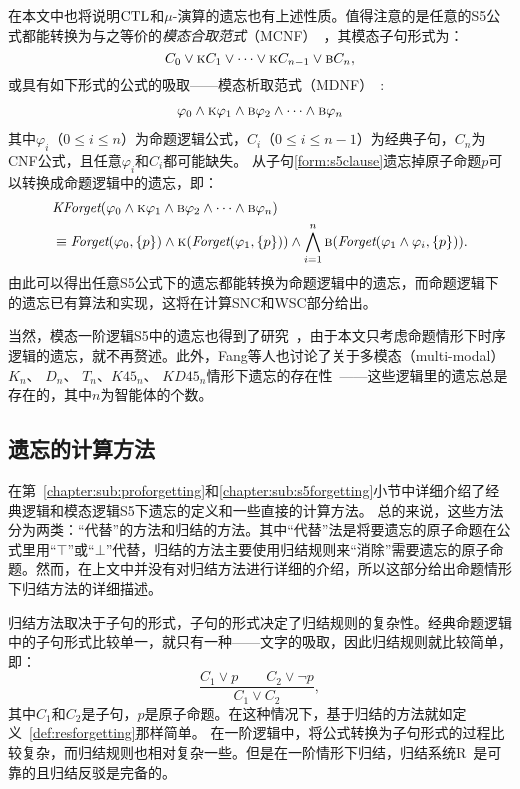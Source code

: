 在本文中也将说明$\textrm{CTL}$和$\mu$-演算的遗忘也有上述性质。值得注意的是任意的S5公式都能转换为与之等价的\emph{模态合取范式}（MCNF）~\cite{DBLP:conf/aaai/Bienvenu07}，其模态子句形式为：
$$C_0 \vee \textsc{k} C_1 \vee \dots \vee \textsc{k} C_{n-1} \vee \textsc{b} C_n,$$
或具有如下形式的公式的吸取——模态析取范式（MDNF）~\cite{Yongmei:IJCAI:2011,Zhang2008Properties}:
\begin{align}\label{form:s5clause}
	\varphi_0 \wedge \textsc{k} \varphi_1 \wedge \textsc{b} \varphi_2 \wedge \dots \wedge \textsc{b} \varphi_n
\end{align}
其中$\varphi_i$（$0\leq i \leq n$）为命题逻辑公式，$C_i$（$0\leq i \leq n-1$）为经典子句，$C_n$为CNF公式，且任意$\varphi_i$和$C_i$都可能缺失。
从子句\ref{form:s5clause}遗忘掉原子命题$p$可以转换成命题逻辑中的遗忘，即：
\begin{align*}
	&\textit{KForget}(\varphi_0 \wedge \textsc{k} \varphi_1 \wedge \textsc{b} \varphi_2 \wedge \dots \wedge \textsc{b} \varphi_n)\\
	&\equiv \textit{Forget}(\varphi_0, \{p\}) \wedge \textsc{k}(\textit{Forget}(\varphi_1, \{p\})) \wedge \bigwedge_{i=1}^{n}\textsc{b}(\textit{Forget}(\varphi_1 \wedge \varphi_i, \{p\})).
\end{align*}
由此可以得出任意S5公式下的遗忘都能转换为命题逻辑中的遗忘，而命题逻辑下的遗忘已有算法和实现，这将在计算SNC和WSC部分给出。



当然，模态一阶逻辑S5中的遗忘也得到了研究~\cite{Yongmei:IJCAI:2011}，由于本文只考虑命题情形下时序逻辑的遗忘，就不再赘述。此外，Fang等人也讨论了关于多模态（multi-modal）$K_n$、 $D_n$、 $T_n$、$K45_n$、 $KD45_n$情形下遗忘的存在性~\cite{DBLP:journals/ai/FangLD19}——这些逻辑里的遗忘总是存在的，其中$n$为智能体的个数。

\subsection{遗忘的计算方法}
在第~\ref{chapter:sub:proforgetting}和\ref{chapter:sub:s5forgetting}小节中详细介绍了经典逻辑和模态逻辑S5下遗忘的定义和一些直接的计算方法。
总的来说，这些方法分为两类：“代替”的方法和归结的方法。其中“代替”法是将要遗忘的原子命题在公式里用“$\top$”或“$\bot$”代替，归结的方法主要使用归结规则来“消除”需要遗忘的原子命题。然而，在上文中并没有对归结方法进行详细的介绍，所以这部分给出命题情形下归结方法的详细描述。%

归结方法取决于子句的形式，子句的形式决定了归结规则的复杂性。经典命题逻辑中的子句形式比较单一，就只有一种——文字的吸取，因此归结规则就比较简单，即：
$$\frac{C_1 \vee p \qquad C_2 \vee \neg p}{C_1 \vee C_2},$$
其中$C_1$和$C_2$是子句，$p$是原子命题。在这种情况下，基于归结的方法就如定义~\ref{def:resforgetting}那样简单。
在一阶逻辑中，将公式转换为子句形式的过程比较复杂，而归结规则也相对复杂一些。但是在一阶情形下归结，归结系统R~\cite{DBLP:books/daglib/0023036}是可靠的且归结反驳是完备的。


